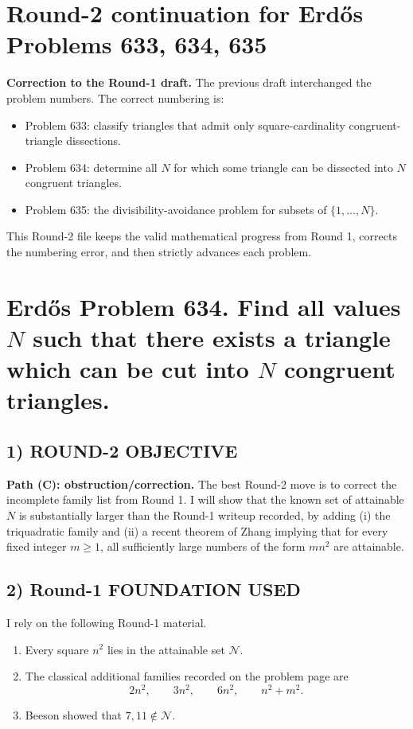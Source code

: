 \section*{Round-2 continuation for Erd\H{o}s Problems 633, 634, 635}

\noindent\textbf{Correction to the Round-1 draft.} The previous draft interchanged the problem numbers. The correct numbering is:
\begin{itemize}
\item Problem 633: classify triangles that admit only square-cardinality congruent-triangle dissections.
\item Problem 634: determine all $N$ for which some triangle can be dissected into $N$ congruent triangles.
\item Problem 635: the divisibility-avoidance problem for subsets of $\{1,\dots,N\}$.
\end{itemize}
This Round-2 file keeps the valid mathematical progress from Round 1, corrects the numbering error, and then strictly advances each problem.

\section*{Erd\H{o}s Problem 634. Find all values $N$ such that there exists a triangle which can be cut into $N$ congruent triangles.}

\subsection*{1) ROUND-2 OBJECTIVE}
\textbf{Path (C): obstruction/correction.} The best Round-2 move is to correct the incomplete family list from Round 1. I will show that the known set of attainable $N$ is substantially larger than the Round-1 writeup recorded, by adding (i) the triquadratic family and (ii) a recent theorem of Zhang implying that for every fixed integer $m\ge 1$, all sufficiently large numbers of the form $mn^2$ are attainable.

\subsection*{2) Round-1 FOUNDATION USED}
I rely on the following Round-1 material.
\begin{enumerate}
\item Every square $n^2$ lies in the attainable set $\mathcal N$.
\item The classical additional families recorded on the problem page are
\[
2n^2,\qquad 3n^2,\qquad 6n^2,\qquad n^2+m^2.
\]
\item Beeson showed that $7,11\notin\mathcal N$.
\end{enumerate}

